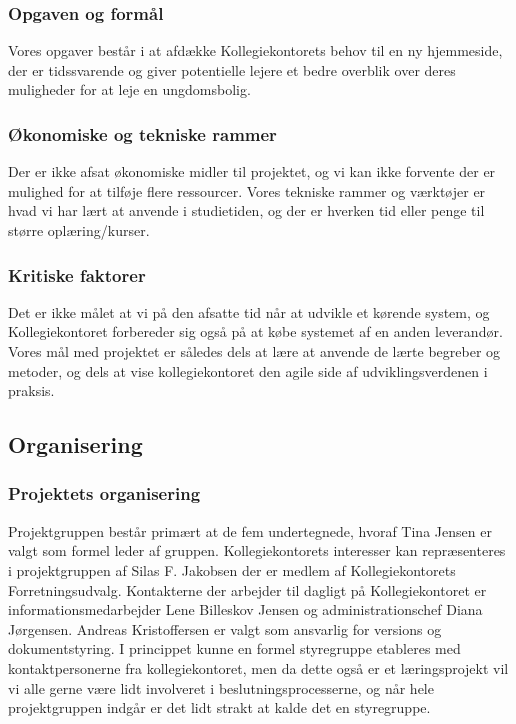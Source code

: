 \documentclass[12pt, a4paper]{report}
\begin{document}
\subsubsection{Opgaven og formål}
Vores opgaver består i at afdække Kollegiekontorets behov til en ny hjemmeside, der er tidssvarende og giver potentielle lejere et bedre overblik over deres muligheder for at leje en ungdomsbolig.

\subsubsection{Økonomiske og tekniske rammer}
Der er ikke afsat økonomiske midler til projektet, og vi kan ikke forvente der er mulighed for at tilføje flere ressourcer. Vores tekniske rammer og værktøjer er hvad vi har lært at anvende i studietiden, og der er hverken tid eller penge til større oplæring/kurser.

\subsubsection{Kritiske faktorer}
Det er ikke målet at vi på den afsatte tid når at udvikle et kørende system, og Kollegiekontoret forbereder sig også på at købe systemet af en anden leverandør. Vores mål med projektet er således dels at lære at anvende de lærte begreber og metoder, og dels at vise kollegiekontoret den agile side af udviklingsverdenen i praksis.

\subsection{Organisering}
\subsubsection{Projektets organisering}
Projektgruppen består primært at de fem undertegnede, hvoraf Tina Jensen er valgt som formel leder af gruppen. Kollegiekontorets interesser kan repræsenteres i projektgruppen af Silas F. Jakobsen der er medlem af Kollegiekontorets Forretningsudvalg. Kontakterne der arbejder til dagligt på Kollegiekontoret er informationsmedarbejder Lene Billeskov Jensen og administrationschef Diana Jørgensen. Andreas Kristoffersen er valgt som ansvarlig for versions og dokumentstyring.
I princippet kunne en formel styregruppe etableres med kontaktpersonerne fra kollegiekontoret, men da dette også er et læringsprojekt vil vi alle gerne være lidt involveret i beslutningsprocesserne, og når hele projektgruppen indgår er det lidt strakt at kalde det en styregruppe.
\end{document}
